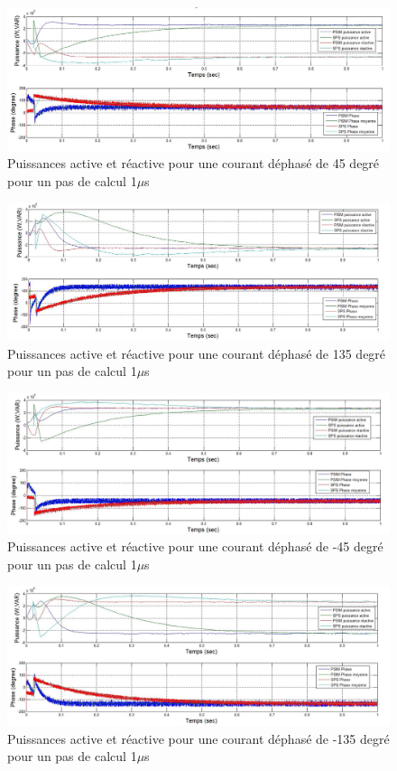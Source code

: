 \documentclass[11pt,letterpaper,final]{report}
\begin{document}
\begin{figure}[htb]
\centering
\includegraphics[scale=0.5]{Fig/AFEIDEAL/pui45.jpg}
\caption{Puissances active et réactive pour une courant déphasé de 45 degré pour un pas de calcul 1$\mu$s}
\label{AF_I_pui_45}
\end{figure}

\begin{figure}[htb]
\centering
\includegraphics[scale=0.5]{Fig/AFEIDEAL/pui135.jpg}
\caption{Puissances active et réactive pour une courant déphasé de 135 degré pour un pas de calcul 1$\mu$s}
\label{AF_I_pui_135}
\end{figure}

\begin{figure}[htb]
\centering
\includegraphics[scale=0.5]{Fig/AFEIDEAL/pui_45.jpg}
\caption{Puissances active et réactive pour une courant déphasé de -45 degré pour un pas de calcul 1$\mu$s}
\label{AF_I_pui__45}
\end{figure}

\begin{figure}[htb]
\centering
\includegraphics[scale=0.5]{Fig/AFEIDEAL/pui_135.jpg}
\caption{Puissances active et réactive pour une courant déphasé de -135 degré pour un pas de calcul 1$\mu$s}
\label{AF_I_pui__135}
\end{figure}
\end{document}
